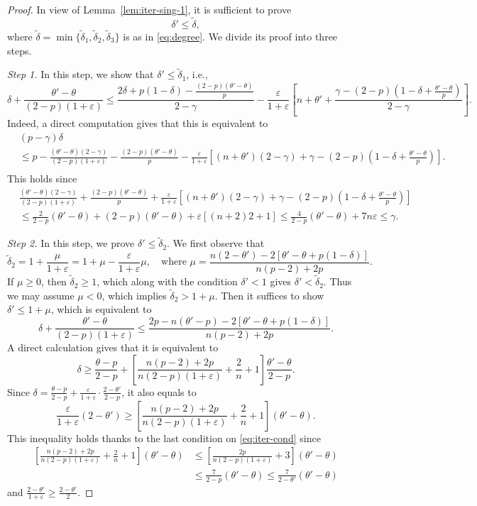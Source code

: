 \documentclass[11pt,oneside,english]{amsart}
\newcommand{\e}{\varepsilon}
\newcommand{\de}{\delta}
\numberwithin{equation}{section}
\theoremstyle{plain}
\numberwithin{equation}{section}
\begin{document}
\begin{proof}
In view of Lemma~\ref{lem:iter-sing-1}, it is sufficient to prove
$$
\de'\le\tilde\de,
$$
where $\tilde\de=\min\{\tilde\de_1,\tilde\de_2,\tilde\de_3\}$ is as in \eqref{eq:degree}. We divide its proof into three steps.

\medskip\noindent\emph{Step 1.} In this step, we show that $\de'\le\tilde\de_1$, i.e.,
$$
\de+\frac{\theta'-\theta}{(2-p)(1+\e)}\le \frac{2\de+p(1-\de)-\frac{(2-p)(\theta'-\theta)}p }{2-\gamma }-\frac{\e}{1+\e}\left[n+\theta'+\frac{\gamma-(2-p)(1-\de+\frac{\theta'-\theta}p) }{2-\gamma} \right].
$$
Indeed, a direct computation gives that this is equivalent to
\begin{align*}
&(p-\gamma)\de\\
&\le p-\frac{(\theta'-\theta)(2-\gamma)}{(2-p)(1+\e)}-\frac{(2-p)(\theta'-\theta)}p-\frac{\e}{1+\e}\left[(n+\theta')(2-\gamma)+\gamma-(2-p)(1-\de+\frac{\theta'-\theta}p) \right].\\
\end{align*}
This holds since
\begin{align*}
    &\frac{(\theta'-\theta)(2-\gamma)}{(2-p)(1+\e)}+\frac{(2-p)(\theta'-\theta)}p+\frac{\e}{1+\e}\left[(n+\theta')(2-\gamma)+\gamma-(2-p)(1-\de+\frac{\theta'-\theta}p)\right]\\
    &\le \frac{2}{2-p}(\theta'-\theta)+(2-p)(\theta'-\theta)+\e[(n+2)2+1]\le\frac4{2-p}(\theta'-\theta)+7n\e\le \gamma.
\end{align*}

\medskip\noindent\emph{Step 2.} In this step, we prove $\de'\le \tilde\de_2$.  We first  observe that
$$
\tilde\de_2=1+\frac{\mu}{1+\e}=1+\mu-\frac{\e}{1+\e}\mu,\quad\text{where }\mu=\frac{n(2-\theta')-2[\theta'-\theta+p(1-\de)] }{n(p-2)+2p }.
$$
If $\mu\ge0$, then $\tilde\de_2\ge1$, which along with the condition $\de'<1$ gives $\de'<\tilde\de_2$. 
Thus we may assume $\mu<0$, which implies $\tilde\de_2>1+\mu$. Then it suffices to show $\de'\le 1+\mu$, which is equivalent to
$$
\de+\frac{\theta'-\theta }{(2-p)(1+\e) }\le\frac{2p-n(\theta'-p)-2[\theta'-\theta+p(1-\de)] }{n(p-2)+2p }.
$$
A direct calculation gives that it is equivalent to
$$
\de\ge\frac{\theta-p}{2-p}+\left[\frac{n(p-2)+2p}{n(2-p)(1+\e)}+\frac2n+1 \right]\frac{\theta'-\theta}{2-p}.
$$
Since $\de=\frac{\theta-p}{2-p}+\frac{\e}{1+\e}\cdot\frac{2-\theta'}{2-p}$, it also equals to
$$
\frac{\e}{1+\e}(2-\theta')\ge\left[\frac{n(p-2)+2p}{n(2-p)(1+\e)}+\frac2n+1 \right](\theta'-\theta).
$$
This inequality holds thanks to the last condition on \eqref{eq:iter-cond} since
\begin{align*}
    \left[\frac{n(p-2)+2p}{n(2-p)(1+\e)}+\frac2n+1 \right](\theta'-\theta)&\le \left[\frac{2p}{n(2-p)(1+\e)}+3 \right](\theta'-\theta)\\
    &\le \frac7{2-p}(\theta'-\theta)\le\frac{7}{2-\theta'}(\theta'-\theta)
\end{align*}
and $
\frac{2-\theta'}{1+\e}\ge\frac{2-\theta'}2.
$


\end{proof}
\end{document}
